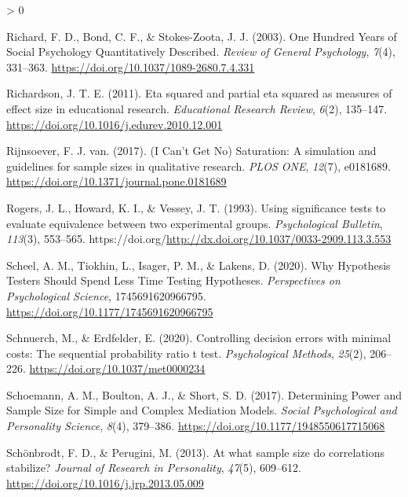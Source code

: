 \documentclass[
  english,
  ,jou, a4paper,floatsintext]{apa6}
\newlength{\cslhangindent}
\newenvironment{CSLReferences}[2] %
 {%
  \setlength{\parindent}{0pt}
  \ifodd #1 \everypar{\setlength{\hangindent}{\cslhangindent}}\ignorespaces\fi
  \ifnum #2 > 0
  \setlength{\parskip}{#2\baselineskip}
  \fi
 }%
 {}
\begin{document}
\begin{CSLReferences}{1}{0}
\leavevmode\hypertarget{ref-richard_one_2003}{}%
Richard, F. D., Bond, C. F., \& Stokes-Zoota, J. J. (2003). One {Hundred Years} of {Social Psychology Quantitatively Described}. \emph{Review of General Psychology}, \emph{7}(4), 331--363. \url{https://doi.org/10.1037/1089-2680.7.4.331}

\leavevmode\hypertarget{ref-richardson_eta_2011}{}%
Richardson, J. T. E. (2011). Eta squared and partial eta squared as measures of effect size in educational research. \emph{Educational Research Review}, \emph{6}(2), 135--147. \url{https://doi.org/10.1016/j.edurev.2010.12.001}

\leavevmode\hypertarget{ref-rijnsoever_i_2017}{}%
Rijnsoever, F. J. van. (2017). ({I Can}'t {Get No}) {Saturation}: A simulation and guidelines for sample sizes in qualitative research. \emph{PLOS ONE}, \emph{12}(7), e0181689. \url{https://doi.org/10.1371/journal.pone.0181689}

\leavevmode\hypertarget{ref-rogers_using_1993}{}%
Rogers, J. L., Howard, K. I., \& Vessey, J. T. (1993). Using significance tests to evaluate equivalence between two experimental groups. \emph{Psychological Bulletin}, \emph{113}(3), 553--565. https://doi.org/\url{http://dx.doi.org/10.1037/0033-2909.113.3.553}

\leavevmode\hypertarget{ref-scheel_why_2020}{}%
Scheel, A. M., Tiokhin, L., Isager, P. M., \& Lakens, D. (2020). Why {Hypothesis Testers Should Spend Less Time Testing Hypotheses}. \emph{Perspectives on Psychological Science}, 1745691620966795. \url{https://doi.org/10.1177/1745691620966795}

\leavevmode\hypertarget{ref-schnuerch_controlling_2020}{}%
Schnuerch, M., \& Erdfelder, E. (2020). Controlling decision errors with minimal costs: The sequential probability ratio t test. \emph{Psychological Methods}, \emph{25}(2), 206--226. \url{https://doi.org/10.1037/met0000234}

\leavevmode\hypertarget{ref-schoemann_determining_2017}{}%
Schoemann, A. M., Boulton, A. J., \& Short, S. D. (2017). Determining {Power} and {Sample Size} for {Simple} and {Complex Mediation Models}. \emph{Social Psychological and Personality Science}, \emph{8}(4), 379--386. \url{https://doi.org/10.1177/1948550617715068}

\leavevmode\hypertarget{ref-schonbrodt_at_2013}{}%
Schönbrodt, F. D., \& Perugini, M. (2013). At what sample size do correlations stabilize? \emph{Journal of Research in Personality}, \emph{47}(5), 609--612. \url{https://doi.org/10.1016/j.jrp.2013.05.009}


\end{CSLReferences}
\end{document}
